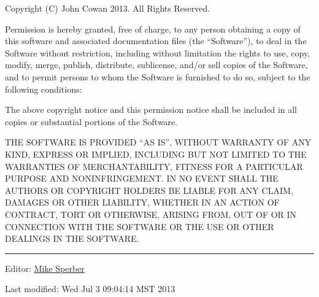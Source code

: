 Copyright (C) John Cowan 2013. All Rights Reserved.

Permission is hereby granted, free of charge, to any person obtaining a
copy of this software and associated documentation files (the
``Software''), to deal in the Software without restriction, including
without limitation the rights to use, copy, modify, merge, publish,
distribute, sublicense, and/or sell copies of the Software, and to
permit persons to whom the Software is furnished to do so, subject to
the following conditions:

The above copyright notice and this permission notice shall be included
in all copies or substantial portions of the Software.

THE SOFTWARE IS PROVIDED ``AS IS'', WITHOUT WARRANTY OF ANY KIND,
EXPRESS OR IMPLIED, INCLUDING BUT NOT LIMITED TO THE WARRANTIES OF
MERCHANTABILITY, FITNESS FOR A PARTICULAR PURPOSE AND NONINFRINGEMENT.
IN NO EVENT SHALL THE AUTHORS OR COPYRIGHT HOLDERS BE LIABLE FOR ANY
CLAIM, DAMAGES OR OTHER LIABILITY, WHETHER IN AN ACTION OF CONTRACT,
TORT OR OTHERWISE, ARISING FROM, OUT OF OR IN CONNECTION WITH THE
SOFTWARE OR THE USE OR OTHER DEALINGS IN THE SOFTWARE.

\begin{center}\rule{0.5\linewidth}{\linethickness}\end{center}

Editor:
\href{mailto:srfi-editors\%20at\%20srfi\%20dot\%20schemers\%20dot\%20org}{Mike
Sperber}

Last modified: Wed Jul 3 09:04:14 MST 2013
